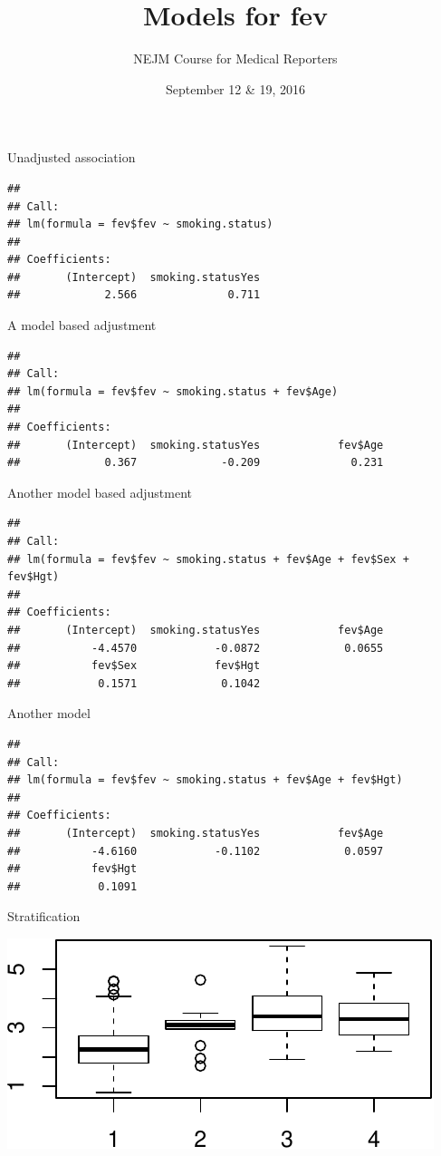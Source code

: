 \documentclass[ignorenonframetext,]{beamer}
\title{Models for fev}
\author{NEJM Course for Medical Reporters}
\date{September 12 \& 19, 2016}
\begin{document}
\frame{\titlepage}

\begin{frame}
\tableofcontents[hideallsubsections]
\end{frame}

\begin{frame}[fragile]{Unadjusted association}

\begin{verbatim}
## 
## Call:
## lm(formula = fev$fev ~ smoking.status)
## 
## Coefficients:
##       (Intercept)  smoking.statusYes  
##             2.566              0.711
\end{verbatim}

\end{frame}

\begin{frame}[fragile]{A model based adjustment}

\begin{verbatim}
## 
## Call:
## lm(formula = fev$fev ~ smoking.status + fev$Age)
## 
## Coefficients:
##       (Intercept)  smoking.statusYes            fev$Age  
##             0.367             -0.209              0.231
\end{verbatim}

\end{frame}

\begin{frame}[fragile]{Another model based adjustment}

\begin{verbatim}
## 
## Call:
## lm(formula = fev$fev ~ smoking.status + fev$Age + fev$Sex + fev$Hgt)
## 
## Coefficients:
##       (Intercept)  smoking.statusYes            fev$Age  
##           -4.4570            -0.0872             0.0655  
##           fev$Sex            fev$Hgt  
##            0.1571             0.1042
\end{verbatim}

\end{frame}

\begin{frame}[fragile]{Another model}

\begin{verbatim}
## 
## Call:
## lm(formula = fev$fev ~ smoking.status + fev$Age + fev$Hgt)
## 
## Coefficients:
##       (Intercept)  smoking.statusYes            fev$Age  
##           -4.6160            -0.1102             0.0597  
##           fev$Hgt  
##            0.1091
\end{verbatim}

\end{frame}

\begin{frame}{Stratification}

\includegraphics{fev_models_files/figure-beamer/unnamed-chunk-5-1.pdf}\\

\end{frame}
\end{document}
